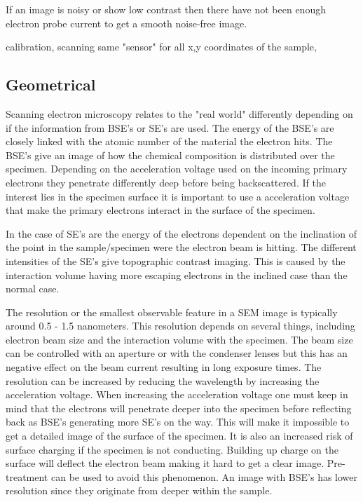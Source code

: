 If an image is noisy or show low contrast then there have not been enough electron probe current to get a smooth noise-free image. 

calibration, scanning same "sensor" for all x,y coordinates of the sample, 

\subsection{Geometrical}
Scanning electron microscopy relates to the "real world" differently depending on if the information from BSE's or SE's are used. The energy of the BSE's are closely linked with the atomic number of the material the electron hits. The BSE's give an image of how the chemical composition is distributed over the specimen. Depending on the acceleration voltage used on the incoming primary electrons they penetrate differently deep before being backscattered. If the interest lies in the specimen surface it is important to use a acceleration voltage that make the primary electrons interact in the surface of the specimen. 

In the case of SE's are the energy of the electrons dependent on the inclination of the point in the sample/specimen were the electron beam is hitting. The different intensities of the SE's give topographic contrast imaging. This is caused by the interaction volume having more escaping electrons in the inclined case than the normal case.

The resolution or the smallest observable feature in a SEM image is typically around 0.5 - 1.5 nanometers. This resolution depends on several things, including electron beam size and the interaction volume with the specimen. The beam size can be controlled with an aperture or with the condenser lenses but this has an negative effect on the beam current resulting in long exposure times. The resolution can be increased by reducing the wavelength by increasing the acceleration voltage. When increasing the acceleration voltage one must keep in mind that the electrons will penetrate deeper into the specimen before reflecting back as BSE's generating more SE's on the way. This will make it impossible to get a detailed image of the surface of the specimen. It is also an increased risk of surface charging if the specimen is not conducting. Building up charge on the surface will deflect the electron beam making it hard to get a clear image. Pre-treatment can be used to avoid this phenomenon. An image with BSE's has lower resolution since they originate from deeper within the sample. 

